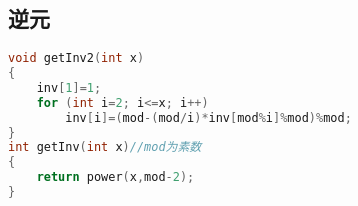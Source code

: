 \subsection{逆元}
    \begin{lstlisting}[language=c++]
void getInv2(int x)
{
    inv[1]=1;
    for (int i=2; i<=x; i++)
        inv[i]=(mod-(mod/i)*inv[mod%i]%mod)%mod;
}
int getInv(int x)//mod为素数
{
    return power(x,mod-2);
}
    \end{lstlisting}